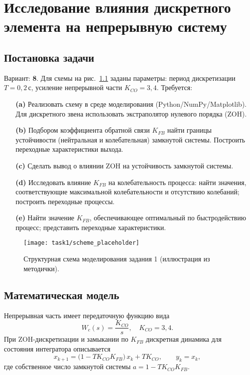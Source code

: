 
\chapter{Исследование влияния дискретного элемента на непрерывную систему}
\section{Постановка задачи}
Вариант: \textbf{8}. Для схемы на рис.~\ref{fig:task1_scheme} заданы параметры: период дискретизации \(T=0{,}2\,\text{с}\), усиление непрерывной части \(K_{CO}=3{,}4\). Требуется:
\begin{enumerate}
  \item[\textbf{(a)}] Реализовать схему в среде моделирования (Python/NumPy/Matplotlib). Для дискретного звена использовать экстраполятор нулевого порядка (ZOH).
  \item[\textbf{(b)}] Подбором коэффициента обратной связи \(K_{FB}\) найти границы устойчивости (нейтральная и колебательная) замкнутой системы. Построить переходные характеристики выхода.
  \item[\textbf{(c)}] Сделать вывод о влиянии ZOH на устойчивость замкнутой системы.
  \item[\textbf{(d)}] Исследовать влияние \(K_{FB}\) на колебательность процесса: найти значения, соответствующие максимальной колебательности и отсутствию колебаний; построить переходные процессы.
  \item[\textbf{(e)}] Найти значение \(K_{FB}\), обеспечивающее оптимальный по быстродействию процесс; представить переходные характеристики.
\end{enumerate}

\begin{figure}[H]
  \centering
  \texttt{[image: task1/scheme\_placeholder]}
  \caption{Структурная схема моделирования задания 1 (иллюстрация из методички).}
  \label{fig:task1_scheme}
\end{figure}

\section{Математическая модель}
Непрерывная часть имеет передаточную функцию вида
\[
  W_c(s) = \frac{K_{CO}}{s}, \quad K_{CO}=3{,}4.
\]
При ZOH-дискретизации и замыкании по \(K_{FB}\) дискретная динамика для состояния интегратора описывается
\[
  x_{k+1} = \bigl(1 - T K_{CO} K_{FB}\bigr)\,x_k + T K_{CO},\qquad y_k = x_k,
\]
где собственное число замкнутой системы \(a = 1 - T K_{CO} K_{FB}\).

